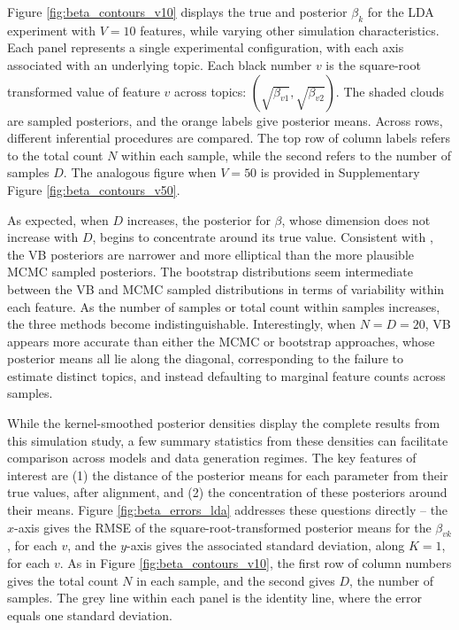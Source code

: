 \documentclass[oupdraft]{bio}
\begin{document}
Figure \ref{fig:beta_contours_v10} displays the true and posterior $\beta_{k}$ for
the LDA experiment with $V = 10$ features, while varying other simulation
characteristics. Each panel represents a single experimental configuration, with
each axis associated with an underlying topic. Each black number $v$ is the
square-root transformed value of feature $v$ across topics:
$\left(\sqrt{\beta_{v1}}, \sqrt{\beta_{v2}}\right)$. The shaded clouds are
sampled posteriors, and the orange labels give posterior means. Across rows,
different inferential procedures are compared. The top row of column labels
refers to the total count $N$ within each sample, while the second refers to the
number of samples $D$. The analogous figure when $V = 50$ is provided in 
Supplementary Figure \ref{fig:beta_contours_v50}.

As expected, when $D$ increases, the posterior for $\beta$, whose dimension does
not increase with $D$, begins to concentrate around its true value. Consistent
with \cite{wang2005inadequacy}, the VB posteriors are narrower and more
elliptical than the more plausible MCMC sampled posteriors. The bootstrap
distributions seem intermediate between the VB and MCMC sampled distributions in
terms of variability within each feature. As the number of samples or total
count within samples increases, the three methods become indistinguishable.
Interestingly, when $N = D = 20$, VB appears more accurate than either the
MCMC or bootstrap approaches, whose posterior means all lie along the diagonal,
corresponding to the failure to estimate distinct topics, and instead defaulting
to marginal feature counts across samples.

While the kernel-smoothed posterior densities display the complete results from
this simulation study, a few summary statistics from these densities can
facilitate comparison across models and data generation regimes. The key
features of interest are (1) the distance of the posterior means for each
parameter from their true values, after alignment, and (2) the concentration of
these posteriors around their means. Figure \ref{fig:beta_errors_lda} addresses
these questions directly -- the $x$-axis gives the RMSE of the
square-root-transformed posterior means for the $\beta_{vk}$, for each $v$, and
the $y$-axis gives the associated standard deviation, along $K = 1$, for each
$v$. As in Figure \ref{fig:beta_contours_v10}, the first row of column numbers
gives the total count $N$ in each sample, and the second gives $D$, the number
of samples. The grey line within each panel is the identity line, where the
error equals one standard deviation.
\end{document}
